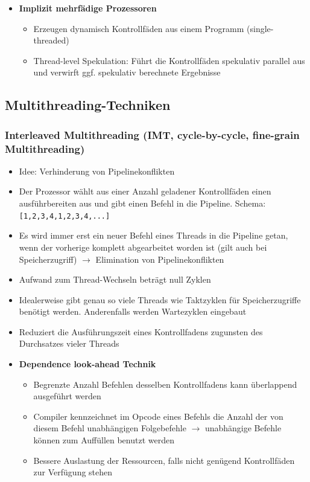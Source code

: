 \begin{itemize}
\begin{itemize}
	\end{itemize}
	\item \textbf{Implizit mehrfädige Prozessoren} %
	\begin{itemize}
		\item Erzeugen dynamisch Kontrollfäden aus einem Programm (single-threaded)
		\item Thread-level Spekulation: Führt die Kontrollfäden spekulativ parallel aus und verwirft ggf. spekulativ berechnete Ergebnisse
	\end{itemize}
\end{itemize}


\subsection{Multithreading-Techniken}

\subsubsection{Interleaved Multithreading (IMT, cycle-by-cycle, fine-grain Multithreading)}
\begin{itemize}
	\item Idee: Verhinderung von Pipelinekonflikten
	\item Der Prozessor wählt aus einer Anzahl geladener Kontrollfäden einen ausführbereiten aus und gibt einen Befehl in die Pipeline. Schema: \texttt{[1,2,3,4,1,2,3,4,...]}
	\item Es wird immer erst ein neuer Befehl eines Threads in die Pipeline getan, wenn der vorherige komplett abgearbeitet worden ist (gilt auch bei Speicherzugriff) \(\rightarrow\) Elimination von Pipelinekonflikten
	\item Aufwand zum Thread-Wechseln beträgt null Zyklen
	\item Idealerweise gibt genau so viele Threads wie Taktzyklen für Speicherzugriffe benötigt werden. Anderenfalls werden Wartezyklen eingebaut
	\item Reduziert die Ausführungszeit eines Kontrollfadens zugunsten des Durchsatzes vieler Threads
	\item \textbf{Dependence look-ahead Technik}
	\begin{itemize}
		\item Begrenzte Anzahl Befehlen desselben Kontrollfadens kann überlappend ausgeführt werden
		\item Compiler kennzeichnet im Opcode eines Befehls die Anzahl der von diesem Befehl unabhängigen Folgebefehle \(\rightarrow\) unabhängige Befehle können zum Auffüllen benutzt werden
		\item Bessere Auslastung der Ressourcen, falls nicht genügend Kontrollfäden zur Verfügung stehen
	\end{itemize}
\end{itemize}

